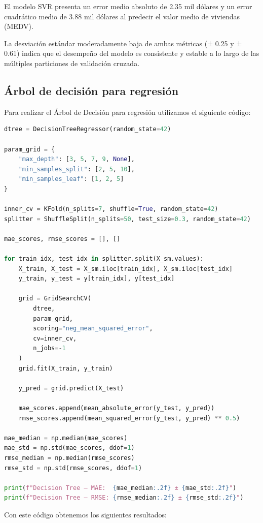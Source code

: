 \documentclass[12pt,a4paper]{article}
\begin{document}
El modelo SVR presenta un error medio absoluto de 2.35 mil dólares y un error cuadrático medio de 3.88 mil dólares al predecir el valor medio de viviendas (MEDV).

La desviación estándar moderadamente baja de ambas métricas (± 0.25 y ± 0.61) indica que el desempeño del modelo es consistente y estable a lo largo de las múltiples particiones de validación cruzada.
\newpage

\subsection{Árbol de decisión para regresión}

Para realizar el Árbol de Decisión para regresión utilizamos el siguiente código:

\begin{lstlisting}[language=Python, frame=single, basicstyle=\ttfamily\small, breaklines=true]
dtree = DecisionTreeRegressor(random_state=42)

param_grid = {
    "max_depth": [3, 5, 7, 9, None],
    "min_samples_split": [2, 5, 10],
    "min_samples_leaf": [1, 2, 5]
}

inner_cv = KFold(n_splits=7, shuffle=True, random_state=42)
splitter = ShuffleSplit(n_splits=50, test_size=0.3, random_state=42)

mae_scores, rmse_scores = [], []

for train_idx, test_idx in splitter.split(X_sm.values):
    X_train, X_test = X_sm.iloc[train_idx], X_sm.iloc[test_idx]
    y_train, y_test = y[train_idx], y[test_idx]

    grid = GridSearchCV(
        dtree,
        param_grid,
        scoring="neg_mean_squared_error",
        cv=inner_cv,
        n_jobs=-1
    )
    grid.fit(X_train, y_train)

    y_pred = grid.predict(X_test)

    mae_scores.append(mean_absolute_error(y_test, y_pred))
    rmse_scores.append(mean_squared_error(y_test, y_pred) ** 0.5)

mae_median = np.median(mae_scores)
mae_std = np.std(mae_scores, ddof=1)
rmse_median = np.median(rmse_scores)
rmse_std = np.std(rmse_scores, ddof=1)

print(f"Decision Tree – MAE:  {mae_median:.2f} ± {mae_std:.2f}")
print(f"Decision Tree – RMSE: {rmse_median:.2f} ± {rmse_std:.2f}")
\end{lstlisting}

Con este código obtenemos los siguientes resultados:
\end{document}
